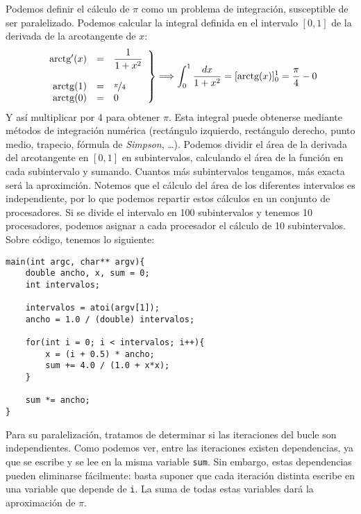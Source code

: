 Podemos definir el cálculo de $\pi$ como un problema de integración, susceptible de ser paralelizado. Podemos calcular la integral definida en el intervalo $[0,1]$ de la derivada de la arcotangente de $x$:
\begin{equation*}
    \left.\begin{array}{rcl}
        \text{arctg}'(x) & = & \dfrac{1}{1+x^2} \\
                  & & \\
        \text{arctg}(1) & = & \nicefrac{\pi}{4} \\
        \text{arctg}(0) & = & 0 
    \end{array}\right\} \Longrightarrow \int_{0}^{1} \dfrac{dx}{1+x^2} = [\text{arctg}(x)]_0^1 = \dfrac{\pi}{4} - 0
\end{equation*}
Y así multiplicar por 4 para obtener $\pi$. Esta integral puede obtenerse mediante métodos de integración numérica (rectángulo izquierdo, rectángulo derecho, punto medio, trapecio, fórmula de \emph{Simpson}, \ldots). Podemos dividir el área de la derivada del arcotangente en $[0,1]$ en subintervalos, calculando el área de la función en cada subintervalo y sumando. Cuantos más subintervalos tengamos, más exacta será la aproximción.
Notemos que el cálculo del área de los diferentes intervalos es independiente, por lo que podemos repartir estos cálculos en un conjunto de procesadores. Si se divide el intervalo en 100 subintervalos y tenemos 10 procesadores, podemos asignar a cada procesador el cálculo de 10 subintervalos. Sobre código, tenemos lo siguiente:
    \begin{verbatim}
main(int argc, char** argv){
    double ancho, x, sum = 0;
    int intervalos;

    intervalos = atoi(argv[1]);
    ancho = 1.0 / (double) intervalos;

    for(int i = 0; i < intervalos; i++){
        x = (i + 0.5) * ancho;
        sum += 4.0 / (1.0 + x*x);
    }

    sum *= ancho;
}
    \end{verbatim}
Para su paralelización, tratamos de determinar si las iteraciones del bucle son independientes. Como podemos ver, entre las iteraciones existen dependencias, ya que se escribe y se lee en la misma variable \verb|sum|. Sin embargo, estas dependencias pueden eliminarse fácilmente: basta suponer que cada iteración distinta escribe en una variable que depende de \verb|i|. La suma de todas estas variables dará la aproximación de $\pi$. 

